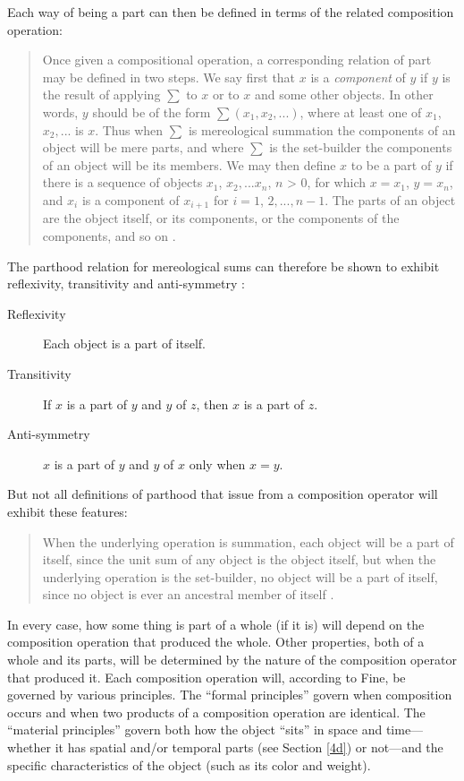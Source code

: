 \documentclass[12pt,twoside]{reedfancy}
\begin{document}
\begin{spacing}{1.25}
Each way of being a part can then be defined in terms of the related
composition operation:

\begin{quote}
Once given a compositional operation, a corresponding relation of part
may be defined in two steps.  We say first that $x$ is a {\em
  component} of $y$ if $y$ is the result of applying $\sum$ to $x$ or
to $x$ and some other objects.  In other words, $y$ should be of the
form $\sum (x_{1}, x_{2}, ... )$, where at least one of
$x_1$, $x_2, ...$ is $x$.  Thus when $\sum$ is mereological
summation the components of an object will be mere parts, and where
$\sum$ is the set-builder the components of an object will be its
members.  We may then define $x$ to be a part of $y$ if there is a
sequence of objects $x_1$, $x_2, ... x_n$, $n$
\textgreater{} $0$, for which $x = x_1$, $y = x_n$, and $x_i$ is a
component of $x_{i+1}$ for $i = 1$, $2, ..., n-1$. The parts
of an object are the object itself, or its components, or the
components of the components, and so on \citep[567--568]{fine2010}.
\end{quote}

The parthood relation for mereological sums can therefore be shown to
exhibit reflexivity, transitivity and anti-symmetry
\citep[568]{fine2010}:

\begin{description}
\item[Reflexivity] Each object is a part of itself.
\item[Transitivity] If $x$ is a part of $y$ and $y$ of $z$, then $x$
  is a part of $z$.
\item[Anti-symmetry] $x$ is a part of $y$ and $y$ of $x$ only when $x
  = y$.
\end{description}

But not all definitions of parthood that issue from a composition
operator will exhibit these features:

\begin{quote}
When the underlying operation is summation, each object will be a part
of itself, since the unit sum of any object is the object itself, but
when the underlying operation is the set-builder, no object will be a
part of itself, since no object is ever an ancestral member of itself
\citep[569]{fine2010}.
\end{quote}

In every case, how some thing is part of a whole (if it is) will
depend on the composition operation that produced the whole.  Other
properties, both of a whole and its parts, will be determined by the
nature of the composition operator that produced it.  Each composition
operation will, according to Fine, be governed by various principles.
The ``formal principles'' govern when composition occurs and when two
products of a composition operation are identical.  The ``material
principles'' govern both how the object ``sits'' in space and
time---whether it has spatial and/or temporal parts (see Section
\ref{4d}) or not---and the specific characteristics of the object
(such as its color and weight).


\end{spacing}
\end{document}
